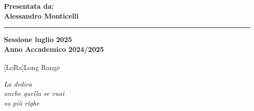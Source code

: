 \documentclass[12pt,a4paper,twoside]{book}
\begin{document}
\begin{titlepage}
\begin{minipage}[t]{0.40\textwidth}
        \vspace{3mm}

    \end{minipage}
    \hfill
    \begin{minipage}[t]{0.40\textwidth}\raggedleft
        {\Large{\bf Presentata da: \\ Alessandro Monticelli}}
    \end{minipage}

    \vspace{30mm}

    \rule[0.5cm]{15.8cm}{0.6mm}

    \begin{center}
        {\large{\bf Sessione luglio 2025 \\}}
        {\large{\bf Anno Accademico 2024/2025\\}}
    \end{center}

\end{titlepage}

[LoRa\textsuperscript{\textcopyright}]{Long Range}
\restoregeometry
\newpage




\topmargin=5.5cm
\begin{flushright}
    \emph{
        \LARGE{La dedica}\\\vspace{2mm}
        \LARGE{anche quella se vuoi}\\\vspace{3mm}
        \LARGE{su più righe}
    }
\end{flushright}
\newpage~\newpage
{}
\end{document}
